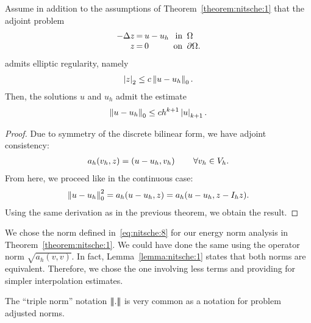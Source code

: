 \begin{theorem}
  Assume in addition to the assumptions of
  Theorem~\ref{theorem:nitsche:1} that the adjoint problem
\begin{gather}
  \arraycolsep1pt
  \begin{array}{rclrl}
    -\Delta z &=& u-u_h
    &\text{ in }&\Omega\\
    z &=& 0 &\text{ on }&\partial\Omega.
  \end{array}
\end{gather}
admits elliptic regularity, namely
\begin{gather}
  \left|z\right|_2 \le c \left\|u-u_h\right\|_0.
\end{gather}
Then, the solutions $u$ and $u_h$ admit the estimate
\begin{gather}
  \left\|u-u_h\right\|_0 \le c h^{k+1} \left|u\right|_{k+1}.
\end{gather}
\end{theorem}

\begin{proof}
  Due to symmetry of the discrete bilinear form, we have adjoint
  consistency:
  \begin{gather}
    a_h(v_h, z) = \form(u-u_h,v_h) \qquad \forall v_h\in V_h.
  \end{gather}
  From here, we proceed like in the continuous case:
  \begin{gather*}
    \left\|u-u_h\right\|_0^2 = a_h(u-u_h,z) = a_h(u-u_h,z-I_h z).
  \end{gather*}
  Using the same derivation as in the previous theorem, we obtain the
  result.
\end{proof}

\begin{remark}
  We chose the norm defined in~\eqref{eq:nitsche:8} for our energy
  norm analysis in Theorem~\ref{theorem:nitsche:1}. We could have done
  the same using the operator norm $\sqrt{a_h(v,v)}$. In fact,
  Lemma~\ref{lemma:nitsche:1} states that both norms are
  equivalent. Therefore, we chose the one involving less terms and
  providing for simpler interpolation estimates.

  The ``triple norm'' notation $\left|\!\left|\!\left|.\right|\!\right|\!\right|$ is very common as a
  notation for problem adjusted norms.
\end{remark}

